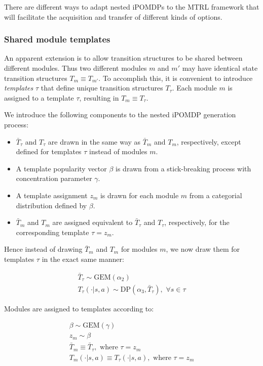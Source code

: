 \documentclass[11pt]{article}
\begin{document}
There are different ways to adapt nested iPOMDPs to the MTRL framework that will facilitate the acquisition and transfer of different kinds of options.

\subsubsection{Shared module templates}

An apparent extension is to allow transition structures to be shared between different modules. Thus two different modules $m$ and $m'$ may have identical state transition structures $T_m \equiv T_{m'}$. To accomplish this, it is convenient to introduce \textit{templates} $\tau$ that define unique transition structures $T_{\tau}$. Each module $m$ is assigned to a template $\tau$, resulting in $T_m \equiv T_\tau$. 

We introduce the following components to the nested iPOMDP generation process:

\begin{itemize}
\item $\bar{T}_\tau$ and $T_\tau$ are drawn in the same way as $\bar{T}_m$ and $T_m$, respectively, except defined for templates $\tau$ instead of modules $m$.
\item A template popularity vector $\beta$ is drawn from a stick-breaking process with concentration parameter $\gamma$.
\item A template assignment $z_m$ is drawn for each module $m$ from a categorial distribution defined by $\beta$.
\item $\bar{T}_m$ and $T_m$ are assigned equivalent to $\bar{T}_\tau$ and $T_\tau$, respectively, for the corresponding template $\tau = z_m$.
\end{itemize}

Hence instead of drawing $\bar{T}_m$ and $T_m$ for modules $m$, we now draw them for templates $\tau$ in the exact same manner:

\begin{align*}
\bar{T}_{\tau} \sim \text{GEM}(\alpha_2)  \\
T_\tau(\cdot|s,a) \sim \text{DP}(\alpha_3, \bar{T}_\tau) ,\,\,\forall s \in \tau
\end{align*}

Modules are assigned to templates according to:

\begin{align*}
\beta \sim \text{GEM}(\gamma) \\
z_m \sim \beta \\
\bar{T}_{m} \equiv \bar{T}_{\tau},  \text{ where } \tau = z_m \\
T_m(\cdot|s,a) \equiv T_\tau(\cdot | s,a), \text{ where } \tau = z_m 
\end{align*}
\end{document}
